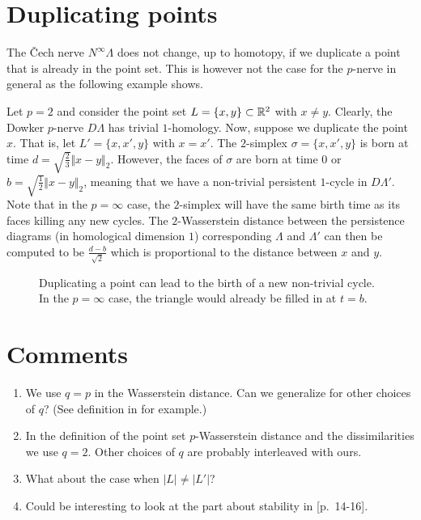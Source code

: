 	\section{Duplicating points}
	The Čech nerve $N^\infty\Lambda$ does not change, up to homotopy, if we duplicate a point that is already in the point set. This is however not the case for the $p$-nerve in general as the following example shows.
	
	\begin{ex}
		Let $p=2$ and consider the point set $L=\{x,y\}\subset\mathbb{R}^2$ with $x\neq y$. Clearly, the Dowker $p$-nerve $D\Lambda$ has trivial $1$-homology. Now, suppose we duplicate the point $x$. That is, let $L'=\{x,x',y\}$ with $x=x'$. The $2$-simplex $\sigma=\{x,x',y\}$ is born at time $d=\sqrt{\frac{2}{3}}\Vert x-y\Vert_2$. However, the faces of $\sigma$ are born at time $0$ or $b=\sqrt{\frac{1}{2}}\Vert x-y\Vert_2$, meaning that we have a non-trivial persistent $1$-cycle in $D\Lambda'$. Note that in the $p=\infty$ case, the $2$-simplex will have the same birth time as its faces killing any new cycles. The $2$-Wasserstein distance between the persistence diagrams (in homological dimension $1$) corresponding $\Lambda$ and $\Lambda'$ can then be computed to be $\frac{d-b}{\sqrt{2}}$ which is proportional to the distance between $x$ and $y$.
		
		\begin{figure}[h!]
			\centering
			
			\caption{Duplicating a point can lead to the birth of a new non-trivial cycle. In the $p=\infty$ case, the triangle would already be filled in at $t=b$.}
		\end{figure}

		
	\end{ex}

	\section{Comments}
	\begin{enumerate}
		\item We use $q=p$ in the Wasserstein distance. Can we generalize for other choices of $q$? (See definition in \autocite{skraba2022wasserstein} for example.)
		\item In the definition of the point set $p$-Wasserstein distance and the dissimilarities we use $q=2$. Other choices of $q$ are probably interleaved with ours.
		\item What about the case when $|L|\neq|L'|$?
		\item Could be interesting to look at the part about stability in \autocite{Brun_2019}[p.~14-16].
	\end{enumerate}

	\printbibliography

